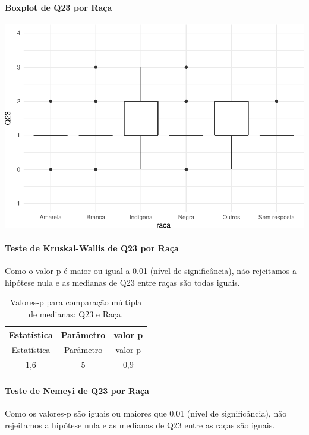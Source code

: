 \documentclass[]{article}
\let\oldparagraph\paragraph
\renewcommand{\paragraph}[1]{\oldparagraph{#1}\mbox{}}
\begin{document}
\hypertarget{boxplot-de-q23-por-rauxe7a}{%
\paragraph{Boxplot de Q23 por Raça}\label{boxplot-de-q23-por-rauxe7a}}

\begin{center}\includegraphics[width=0.75\linewidth]{relatorio_covid19_files/figure-latex/unnamed-chunk-578-1} \end{center}

\hypertarget{teste-de-kruskal-wallis-de-q23-por-rauxe7a}{%
\paragraph{Teste de Kruskal-Wallis de Q23 por Raça}\label{teste-de-kruskal-wallis-de-q23-por-rauxe7a}}

Como o valor-p é maior ou igual a 0.01 (nível de significância), não rejeitamos a hipótese nula e as medianas de Q23 entre raças são todas iguais.

\begin{longtable}[]{@{}ccc@{}}
\caption{\label{tab:unnamed-chunk-580}Valores-p para comparação múltipla de medianas: Q23 e Raça.}\tabularnewline
\toprule
Estatística & Parâmetro & valor p\tabularnewline
\midrule
\endfirsthead
\toprule
Estatística & Parâmetro & valor p\tabularnewline
\midrule
\endhead
1,6 & 5 & 0,9\tabularnewline
\bottomrule
\end{longtable}

\hypertarget{teste-de-nemeyi-de-q23-por-rauxe7a}{%
\paragraph{Teste de Nemeyi de Q23 por Raça}\label{teste-de-nemeyi-de-q23-por-rauxe7a}}

Como os valores-p são iguais ou maiores que 0.01 (nível de significância), não rejeitamos a hipótese nula e as medianas de Q23 entre as raças são iguais.
\end{document}
